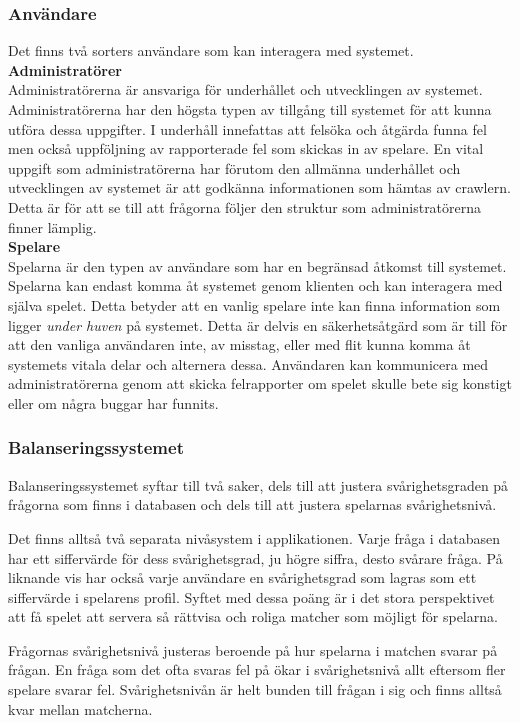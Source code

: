 \documentclass[a4paper, 11pt]{article}
\begin{document}
\subsubsection{Användare}
Det finns två sorters användare som kan interagera med systemet.\\
\textbf{Administratörer} \label{admins} \\
Administratörerna är ansvariga för underhållet och utvecklingen av systemet. Administratörerna har den högsta typen av tillgång till systemet för att kunna utföra dessa uppgifter. I underhåll innefattas att felsöka och åtgärda funna fel men också uppföljning av rapporterade fel som skickas in av spelare. En vital uppgift som administratörerna har förutom den allmänna underhållet och utvecklingen av systemet är att godkänna informationen som hämtas av crawlern. Detta är för att se till att frågorna följer den struktur som administratörerna finner lämplig. \\
\textbf{Spelare}\\
Spelarna är den typen av användare som har en begränsad åtkomst till systemet. Spelarna kan endast komma åt systemet genom klienten och kan interagera med själva spelet. Detta betyder att en vanlig spelare inte kan finna information som ligger \textit{under huven} på systemet. Detta är delvis en säkerhetsåtgärd som är till för att den vanliga användaren inte, av misstag, eller med flit kunna komma åt systemets vitala delar och alternera dessa. Användaren kan kommunicera med administratörerna genom att skicka felrapporter om spelet skulle bete sig konstigt eller om några buggar har funnits.

\subsubsection{Balanseringssystemet}
Balanseringssystemet syftar till två saker, dels till att justera svårighetsgraden på frågorna som finns i databasen och dels till att justera spelarnas svårighetsnivå. 

Det finns alltså två separata nivåsystem i applikationen. Varje fråga i databasen har ett siffervärde för dess svårighetsgrad, ju högre siffra, desto svårare fråga. På liknande vis har också varje användare en svårighetsgrad som lagras som ett siffervärde i spelarens profil. Syftet med dessa poäng är i det stora perspektivet att få spelet att servera så rättvisa och roliga matcher som möjligt för spelarna. 

Frågornas svårighetsnivå justeras beroende på hur spelarna i matchen svarar på frågan. En fråga som det ofta svaras fel på ökar i svårighetsnivå allt eftersom fler spelare svarar fel. Svårighetsnivån är helt bunden till frågan i sig och finns alltså kvar mellan matcherna.
\end{document}

